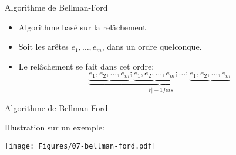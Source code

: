 
\begin{frame}{Algorithme de Bellman-Ford}

\begin{center}
{\small
{}}
\end{center}

\bigskip

\begin{itemize}
\item Algorithme basé sur la relâchement
\item Soit les arêtes $e_1,\ldots,e_m$, dans un ordre quelconque.
\item Le relâchement se fait dans cet ordre:
$$\underbrace{\underbrace{e_1,e_2,\ldots,e_m};\underbrace{e_1,e_2,\ldots,e_m};\ldots;\underbrace{e_1,e_2,\ldots,e_m}}_{|V|-1 fois}$$
\end{itemize}

\end{frame}

\begin{frame}{Algorithme de Bellman-Ford}

\begin{center}
{\small
{}}
\end{center}

\bigskip

Illustration sur un exemple:

\centerline{\texttt{[image: Figures/07-bellman-ford.pdf]}}

\end{frame}


